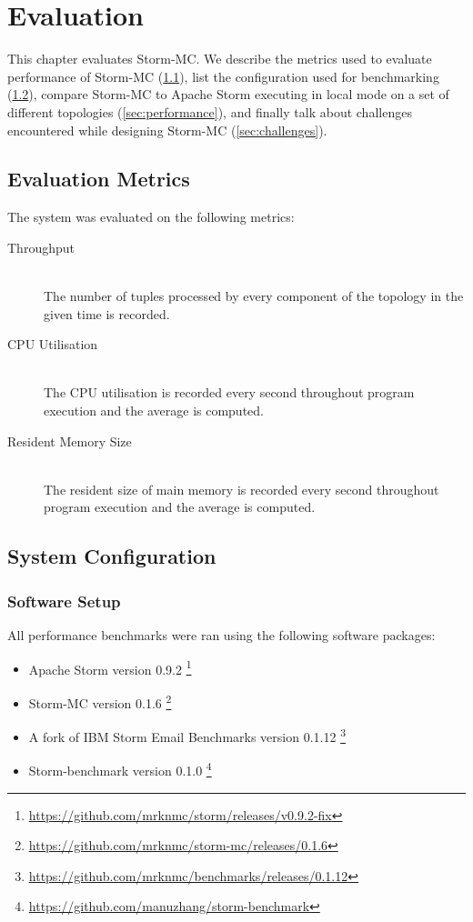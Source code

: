 \chapter{Evaluation}

This chapter evaluates Storm-MC. We describe the metrics used to evaluate performance of Storm-MC (\ref{sec:metrics}), list the configuration used for benchmarking (\ref{sec:system_conf}), compare Storm-MC to Apache Storm executing in local mode on a set of different topologies (\ref{sec:performance}), and finally talk about challenges encountered while designing Storm-MC (\ref{sec:challenges}).

\section{Evaluation Metrics}
\label{sec:metrics}

The system was evaluated on the following metrics:

\begin{description}
	\item[Throughput] \hfill \\
	The number of tuples processed by every component of the topology in the given time is recorded.
	\item[CPU Utilisation] \hfill \\
	The CPU utilisation is recorded every second throughout program execution and the average is computed.
	\item[Resident Memory Size] \hfill \\
	The resident size of main memory is recorded every second throughout program execution and the average is computed.
\end{description}

\section{System Configuration}
\label{sec:system_conf}

\subsection{Software Setup}

All performance benchmarks were ran using the following software packages:

\begin{itemize}
	\item Apache Storm version 0.9.2 \footnote{\url{https://github.com/mrknmc/storm/releases/v0.9.2-fix}}
	\item Storm-MC version 0.1.6 \footnote{\url{https://github.com/mrknmc/storm-mc/releases/0.1.6}}
	\item A fork of IBM Storm Email Benchmarks version 0.1.12 \footnote{\url{https://github.com/mrknmc/benchmarks/releases/0.1.12}}
	\item Storm-benchmark version 0.1.0 \footnote{\url{https://github.com/manuzhang/storm-benchmark}}
\end{itemize}


